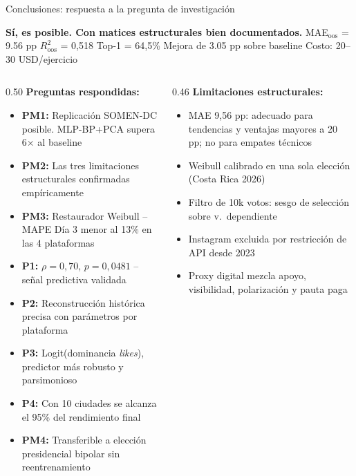 \begin{frame}{Conclusiones: respuesta a la pregunta de investigación}
  \begin{block}{\textbf{Sí, es posible. Con matices estructurales bien documentados.}}
    \small MAE$_{\text{oos}}$ = \num{9,56} pp \quad $R^2_{\text{oos}}$ = 0,518 \quad Top-1 = 64,5\% \quad Mejora de \num{3,05} pp sobre baseline \quad Costo: 20--30 USD/ejercicio
  \end{block}

  \vspace{0.2em}
  \begin{columns}[T]
    \begin{column}{0.50\textwidth}
      {\small\textbf{Preguntas respondidas:}}
      \begin{itemize}\scriptsize
        \item \textbf{PM1:} Replicación SOMEN-DC posible. MLP-BP+PCA supera 6$\times$ al baseline
        \item \textbf{PM2:} Las tres limitaciones estructurales confirmadas empíricamente
        \item \textbf{PM3:} Restaurador Weibull -- MAPE Día 3 menor al 13\% en las 4 plataformas
        \item \textbf{P1:} $\rho = 0{,}70$, $p = 0{,}0481$ -- señal predictiva validada
        \item \textbf{P2:} Reconstrucción histórica precisa con parámetros por plataforma
        \item \textbf{P3:} Logit(dominancia \textit{likes}), predictor más robusto y parsimonioso
        \item \textbf{P4:} Con 10 ciudades se alcanza el 95\% del rendimiento final
        \item \textbf{PM4:} Transferible a elección presidencial bipolar sin reentrenamiento
      \end{itemize}
    \end{column}
    \begin{column}{0.46\textwidth}
      {\small\textbf{Limitaciones estructurales:}}
      \begin{itemize}\scriptsize
        \item MAE 9,56 pp: adecuado para tendencias y ventajas mayores a 20 pp; no para empates técnicos
        \item Weibull calibrado en una sola elección (Costa Rica 2026)
        \item Filtro de 10k votos: sesgo de selección sobre v.\ dependiente
        \item Instagram excluida por restricción de API desde 2023
        \item Proxy digital mezcla apoyo, visibilidad, polarización y pauta paga \corr{[2.1]}
      \end{itemize}
    \end{column}
  \end{columns}
\end{frame}

